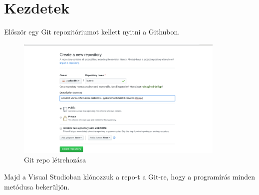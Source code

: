 \documentclass{article}
\begin{document}
\section{Kezdetek}
Először egy Git repozitóriumot kellett nyitni a Githubon.
\begin{figure}[h!]
\includegraphics[width=10cm]{git.png}
\caption{Git repo létrehozása}
\end{figure}
Majd a Visual Studioban klónozzuk a repo-t a Git-re, hogy a programírás minden metódusa bekerüljön. 
\end{document}
